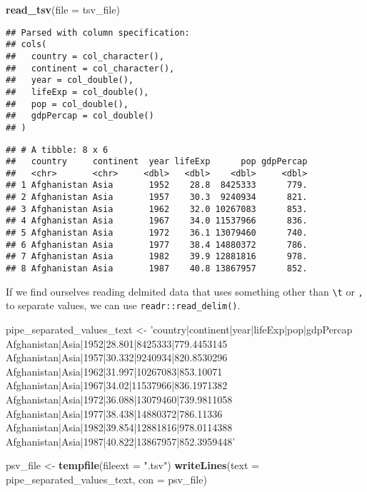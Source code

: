 \documentclass[
]{book}
\newenvironment{Shaded}{\begin{snugshade}}{\end{snugshade}}
\newcommand{\DataTypeTok}[1]{\textcolor[rgb]{0.13,0.29,0.53}{#1}}
\newcommand{\KeywordTok}[1]{\textcolor[rgb]{0.13,0.29,0.53}{\textbf{#1}}}
\newcommand{\NormalTok}[1]{#1}
\newcommand{\StringTok}[1]{\textcolor[rgb]{0.31,0.60,0.02}{#1}}
\begin{document}
\begin{Shaded}
\begin{Highlighting}[]
\KeywordTok{read_tsv}\NormalTok{(}\DataTypeTok{file =}\NormalTok{ tsv_file)}
\end{Highlighting}
\end{Shaded}

\begin{verbatim}
## Parsed with column specification:
## cols(
##   country = col_character(),
##   continent = col_character(),
##   year = col_double(),
##   lifeExp = col_double(),
##   pop = col_double(),
##   gdpPercap = col_double()
## )
\end{verbatim}

\begin{verbatim}
## # A tibble: 8 x 6
##   country     continent  year lifeExp      pop gdpPercap
##   <chr>       <chr>     <dbl>   <dbl>    <dbl>     <dbl>
## 1 Afghanistan Asia       1952    28.8  8425333      779.
## 2 Afghanistan Asia       1957    30.3  9240934      821.
## 3 Afghanistan Asia       1962    32.0 10267083      853.
## 4 Afghanistan Asia       1967    34.0 11537966      836.
## 5 Afghanistan Asia       1972    36.1 13079460      740.
## 6 Afghanistan Asia       1977    38.4 14880372      786.
## 7 Afghanistan Asia       1982    39.9 12881816      978.
## 8 Afghanistan Asia       1987    40.8 13867957      852.
\end{verbatim}

If we find ourselves reading delmited data that uses something other than \texttt{\textbackslash{}t} or \texttt{,} to separate values, we can use \texttt{readr::read\_delim()}.

\begin{Shaded}
\begin{Highlighting}[]
\NormalTok{pipe_separated_values_text <-}\StringTok{ }
\StringTok{'country|continent|year|lifeExp|pop|gdpPercap     }
\StringTok{Afghanistan|Asia|1952|28.801|8425333|779.4453145}
\StringTok{Afghanistan|Asia|1957|30.332|9240934|820.8530296}
\StringTok{Afghanistan|Asia|1962|31.997|10267083|853.10071}
\StringTok{Afghanistan|Asia|1967|34.02|11537966|836.1971382}
\StringTok{Afghanistan|Asia|1972|36.088|13079460|739.9811058}
\StringTok{Afghanistan|Asia|1977|38.438|14880372|786.11336}
\StringTok{Afghanistan|Asia|1982|39.854|12881816|978.0114388}
\StringTok{Afghanistan|Asia|1987|40.822|13867957|852.3959448'}

\NormalTok{psv_file <-}\StringTok{ }\KeywordTok{tempfile}\NormalTok{(}\DataTypeTok{fileext =} \StringTok{".tsv"}\NormalTok{)}
\KeywordTok{writeLines}\NormalTok{(}\DataTypeTok{text =}\NormalTok{ pipe_separated_values_text, }\DataTypeTok{con =}\NormalTok{ psv_file)}
\end{Highlighting}
\end{Shaded}
\end{document}
